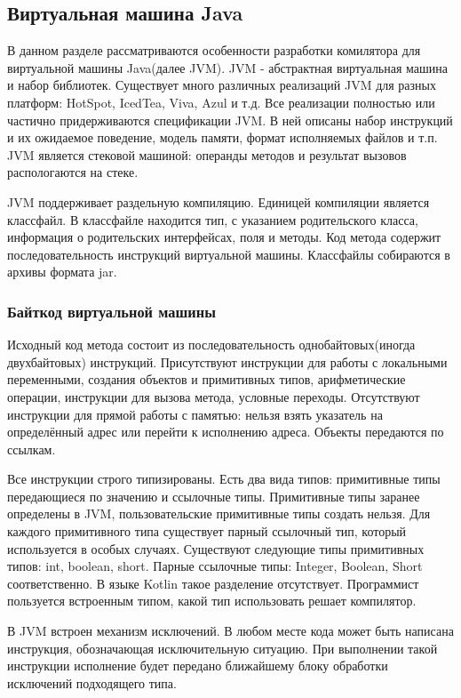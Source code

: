 \subsection{Виртуальная машина Java}
В данном разделе рассматриваются особенности разработки комилятора для виртуальной машины Java(далее JVM). JVM - абстрактная виртуальная машина и набор библиотек. Существует много различных реализаций JVM для разных платформ: HotSpot, IcedTea, Viva, Azul и т.д. Все реализации полностью или частично придерживаются спецификации JVM. В ней описаны набор инструкций и их ожидаемое поведение, модель памяти, формат исполняемых файлов и т.п. JVM является стековой машиной: операнды методов и результат вызовов распологаются на стеке.

JVM поддерживает раздельную компиляцию. Единицей компиляции является классфайл. В классфайле находится тип, с указанием родительского класса, информация о родительских интерфейсах, поля и методы. Код метода содержит последовательность инструкций виртуальной машины. Классфайлы собираются в архивы формата jar.

\subsubsection{Байткод виртуальной машины}
Исходный код метода состоит из последовательность однобайтовых(иногда двухбайтовых) инструкций. Присутствуют инструкции для работы с локальными переменными, создания объектов и примитивных типов, арифметические операции, инструкции для вызова метода, условные переходы. Отсутствуют инструкции для прямой работы с памятью: нельзя взять указатель на определённый адрес или перейти к исполнению адреса. Объекты передаются по ссылкам.

Все инструкции строго типизированы. Есть два вида типов: примитивные типы передающиеся по значению и ссылочные типы. Примитивные типы заранее определены в JVM, пользовательские примитивные типы создать нельзя. Для каждого примитивного типа существует парный ссылочный тип, который используется в особых случаях. Существуют следующие типы примитивных типов: int, boolean, short. Парные ссылочные типы: Integer, Boolean, Short соответственно. В языке Kotlin такое разделение отсутствует. Программист пользуется встроенным типом, какой тип использовать решает компилятор.

В JVM встроен механизм исключений. В любом месте кода может быть написана инструкция, обозначающая исключительную ситуацию. При выполнении такой инструкции исполнение будет передано ближайшему блоку обработки исключений подходящего типа.

